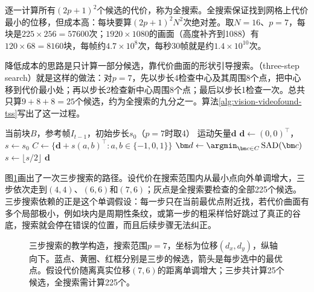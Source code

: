 逐一计算所有$(2p+1)^2$个候选的代价，称为全搜索。全搜索保证找到网格上代价最小的位移，但成本高：每块要算$(2p+1)^2N^2$次绝对差。取$N=16$、$p=7$，每块是$225\times256=57600$次；$1920\times1080$的画面（高度补齐到1088）有$120\times68=8160$块，每帧约$4.7\times10^8$次，每秒30帧就是约$1.4\times10^{10}$次。

降低成本的思路是只计算一部分候选，靠代价曲面的形状引导搜索。（three-step search）就是这样的做法：对$p=7$，先以步长4检查中心及其周围8个点，把中心移到代价最小处；再以步长2检查新中心周围8个点；最后以步长1检查一次。总共只算$9+8+8=25$个候选，约为全搜索的九分之一。算法\ref{alg:vision-videofound-tss}写出了这一过程。

\begin{algorithm}[三步搜索]
  \label{alg:vision-videofound-tss}
  \begin{algorithmic}[1]
    \Require 当前块$B$，参考帧$I_{t-1}$，初始步长$s_0$（$p=7$时取4）
    \Ensure 运动矢量$\bm d$
    \State $\bm d\gets(0,0)^\top$，$s\gets s_0$
      \State $C\gets\{\bm d+s(a,b)^\top:a,b\in\{-1,0,1\}\}$
      \State $\bm d\gets\argmin_{\bm c\in C}\operatorname{SAD}(\bm c)$
      \State $s\gets\lfloor s/2\rfloor$
    \EndWhile
    \State \Return $\bm d$
  \end{algorithmic}
\end{algorithm}

图\ref{fig:vision-videofound-block-matching}画出了一次三步搜索的路径。设代价在搜索范围内从最小点向外单调增大，三步依次走到$(4,4)$、$(6,6)$和$(7,6)$；灰点是全搜索要检查的全部225个候选。三步搜索依赖的正是这个单调假设：每一步只在当前最优点附近找，若代价曲面有多个局部极小，例如块内是周期性条纹，或第一步的粗采样恰好跳过了真正的谷底，搜索就会停在错误的位置，而且后续步骤无法纠正。

\begin{figure}[htbp]
  \centering
  
  \caption{三步搜索的教学构造，搜索范围$p=7$，坐标为位移$(d_x,d_y)$，纵轴向下。蓝点、黄圈、红框分别是三步的候选，箭头是每步选中的最优点。假设代价随离真实位移$(7,6)$的距离单调增大；三步共计算25个候选，全搜索需计算225个。}
  \label{fig:vision-videofound-block-matching}
\end{figure}

